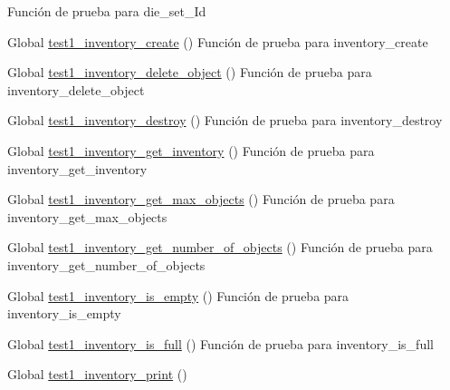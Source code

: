 \begin{DoxyRefList}
%
Función de prueba para die\+\_\+set\+\_\+\+Id  
\item[Global \mbox{\hyperlink{inventory__test_8c_a33638f1a88ae16ab8d6bee00145b82b8}{test1\+\_\+inventory\+\_\+create}} ()]\label{test__test000065}%
%
Función de prueba para inventory\+\_\+create  
\item[Global \mbox{\hyperlink{inventory__test_8c_af6ad6f6d577b5f123f36351139c6d918}{test1\+\_\+inventory\+\_\+delete\+\_\+object}} ()]\label{test__test000080}%
%
Función de prueba para inventory\+\_\+delete\+\_\+object  
\item[Global \mbox{\hyperlink{inventory__test_8c_ab161eafe6a61db39b2237e97c677d822}{test1\+\_\+inventory\+\_\+destroy}} ()]\label{test__test000067}%
%
Función de prueba para inventory\+\_\+destroy  
\item[Global \mbox{\hyperlink{inventory__test_8c_a4fabef11aa72defe00459c078ae42af4}{test1\+\_\+inventory\+\_\+get\+\_\+inventory}} ()]\label{test__test000075}%
%
Función de prueba para inventory\+\_\+get\+\_\+inventory  
\item[Global \mbox{\hyperlink{inventory__test_8c_a17c5d7d6ecb4161696deca0155e13f4f}{test1\+\_\+inventory\+\_\+get\+\_\+max\+\_\+objects}} ()]\label{test__test000099}%
%
Función de prueba para inventory\+\_\+get\+\_\+max\+\_\+objects  
\item[Global \mbox{\hyperlink{inventory__test_8c_a8ae9f8ddebed8f6dfcda767c1715076d}{test1\+\_\+inventory\+\_\+get\+\_\+number\+\_\+of\+\_\+objects}} ()]\label{test__test000073}%
%
Función de prueba para inventory\+\_\+get\+\_\+number\+\_\+of\+\_\+objects  
\item[Global \mbox{\hyperlink{inventory__test_8c_afe8c9730e30b58535afc0481970ab2b1}{test1\+\_\+inventory\+\_\+is\+\_\+empty}} ()]\label{test__test000085}%
%
Función de prueba para inventory\+\_\+is\+\_\+empty  
\item[Global \mbox{\hyperlink{inventory__test_8c_a7eb3ba387e33c42ff45331c9d9aada34}{test1\+\_\+inventory\+\_\+is\+\_\+full}} ()]\label{test__test000088}%
%
Función de prueba para inventory\+\_\+is\+\_\+full  
\item[Global \mbox{\hyperlink{inventory__test_8c_a7229ceb1916b0da955d23598da89d5ea}{test1\+\_\+inventory\+\_\+print}} ()]\label{test__test000077}%
%

\end{DoxyRefList}
